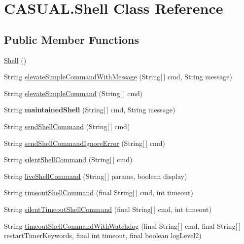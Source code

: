 \hypertarget{class_c_a_s_u_a_l_1_1_shell}{\section{C\-A\-S\-U\-A\-L.\-Shell Class Reference}
\label{class_c_a_s_u_a_l_1_1_shell}
}
\subsection*{Public Member Functions}
\begin{DoxyCompactItemize}
\item 
\hyperlink{class_c_a_s_u_a_l_1_1_shell_a708fd05c53f187f1e8278972a2a55b5c}{Shell} ()
\item 
String \hyperlink{class_c_a_s_u_a_l_1_1_shell_ae42f2d9c2e19a6185deff5b9600844fb}{elevate\-Simple\-Command\-With\-Message} (String\mbox{[}$\,$\mbox{]} cmd, String message)
\item 
String \hyperlink{class_c_a_s_u_a_l_1_1_shell_a228ae0a36fd9bf8773b20d9ce67d186a}{elevate\-Simple\-Command} (String\mbox{[}$\,$\mbox{]} cmd)
\item 
\hypertarget{class_c_a_s_u_a_l_1_1_shell_a06aa90986783232d0a5e355a8debc357}{String {\bfseries maintained\-Shell} (String\mbox{[}$\,$\mbox{]} cmd, String message)}\label{class_c_a_s_u_a_l_1_1_shell_a06aa90986783232d0a5e355a8debc357}

\item 
String \hyperlink{class_c_a_s_u_a_l_1_1_shell_a7b3433f703f854ebccf0d0fb03ace169}{send\-Shell\-Command} (String\mbox{[}$\,$\mbox{]} cmd)
\item 
String \hyperlink{class_c_a_s_u_a_l_1_1_shell_abf0198707d3bbaac312a099b70896c8f}{send\-Shell\-Command\-Ignore\-Error} (String\mbox{[}$\,$\mbox{]} cmd)
\item 
String \hyperlink{class_c_a_s_u_a_l_1_1_shell_a7b5fe192fb2f8643e0abf9be080108c6}{silent\-Shell\-Command} (String\mbox{[}$\,$\mbox{]} cmd)
\item 
String \hyperlink{class_c_a_s_u_a_l_1_1_shell_a8bb7dfcf5e0b9fac3168bc2a89115964}{live\-Shell\-Command} (String\mbox{[}$\,$\mbox{]} params, boolean display)
\item 
String \hyperlink{class_c_a_s_u_a_l_1_1_shell_a84ab38f944a2af24e3283103e80b743c}{timeout\-Shell\-Command} (final String\mbox{[}$\,$\mbox{]} cmd, int timeout)
\item 
String \hyperlink{class_c_a_s_u_a_l_1_1_shell_a50d89a1c8176f36f111e9b259e8fb3d7}{silent\-Timeout\-Shell\-Command} (final String\mbox{[}$\,$\mbox{]} cmd, int timeout)
\item 
String \hyperlink{class_c_a_s_u_a_l_1_1_shell_ab202c639085fb78e9aeca44ec8288217}{timeout\-Shell\-Command\-With\-Watchdog} (final String\mbox{[}$\,$\mbox{]} cmd, final String\mbox{[}$\,$\mbox{]} restart\-Timer\-Keywords, final int timeout, final boolean log\-Level2)
\end{DoxyCompactItemize}


